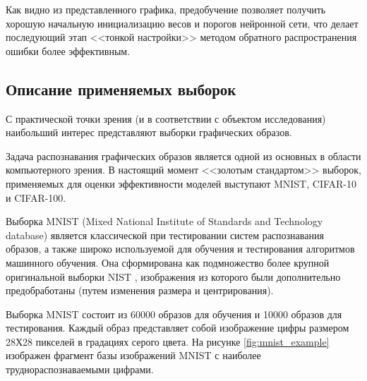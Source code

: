 Как видно из представленного графика, предобучение позволяет получить хорошую начальную инициализацию весов и порогов нейронной сети, что делает последующий этап <<тонкой настройки>> методом обратного распространения ошибки более эффективным.

\subsection{Описание применяемых выборок}

С практической точки зрения (и в соответствии с объектом исследования) наибольший интерес представляют выборки графических образов.

Задача распознавания графических образов является одной из основных в области компьютерного зрения. В настоящий момент <<золотым стандартом>> выборок, применяемых для оценки эффективности моделей выступают MNIST, CIFAR-10 и CIFAR-100. %

Выборка MNIST (Mixed National Institute of Standards and Technology database) является классической при тестировании систем распознавания образов, а также широко используемой для обучения и тестирования алгоритмов машинного обучения. Она сформирована как подмножество более крупной оригинальной выборки NIST \cite{mnist}, изображения из которого были дополнительно предобработаны (путем изменения размера и центрирования). 

Выборка MNIST состоит из 60000 образов для обучения и 10000 образов для тестирования. Каждый образ представляет собой изображение цифры размером 28Х28 пикселей в градациях серого цвета. На рисунке \ref{fig:mnist_example} изображен фрагмент базы изображений MNIST с наиболее труднораспознаваемыми цифрами.

